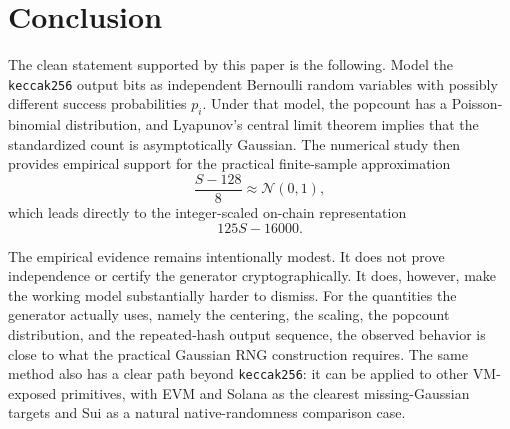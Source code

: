 \documentclass[11pt]{article}
\begin{document}
\section{Conclusion}

The clean statement supported by this paper is the following. Model the
\texttt{keccak256} output bits as independent Bernoulli random variables with
possibly different success probabilities $p_i$. Under that model, the popcount
has a Poisson-binomial distribution, and Lyapunov's central limit theorem
implies that the standardized count is asymptotically Gaussian. The numerical
study then provides empirical support for the practical finite-sample
approximation
\[
\frac{S-128}{8} \approx \mathcal{N}(0,1),
\]
which leads directly to the integer-scaled on-chain representation
\[
125S - 16000.
\]

The empirical evidence remains intentionally modest. It does not prove
independence or certify the generator cryptographically. It does, however, make
the working model substantially harder to dismiss. For the quantities the
generator actually uses, namely the centering, the scaling, the popcount
distribution, and the repeated-hash output sequence, the observed behavior is
close to what the practical Gaussian RNG construction requires. The same method
also has a clear path beyond \texttt{keccak256}: it can be applied to other
VM-exposed primitives, with EVM and Solana as the clearest missing-Gaussian
targets and Sui as a natural native-randomness comparison case.
\end{document}
